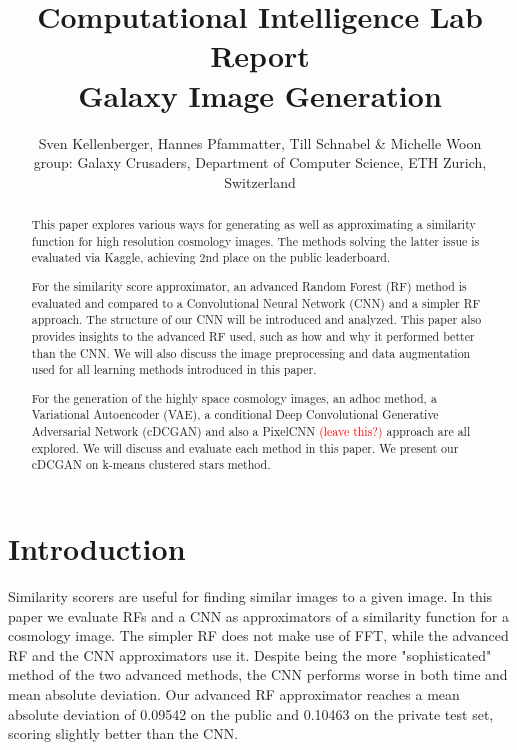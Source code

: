 \documentclass[10pt,conference,compsocconf]{IEEEtran}
\newcommand\TODO[1]{\textcolor{red}{#1}} %
\begin{document}
\title{Computational Intelligence Lab Report\\ {\large Galaxy Image Generation}}

\author{Sven Kellenberger, Hannes Pfammatter, Till Schnabel & Michelle Woon \\group: Galaxy Crusaders, Department of Computer Science, ETH Zurich, Switzerland}

\maketitle

\begin{abstract}
This paper explores various ways for generating as well as approximating a similarity function for high resolution cosmology images. The methods solving the latter issue is evaluated via Kaggle\cite{Kaggle}, achieving 2nd place on the public leaderboard.

For the similarity score approximator, an advanced Random Forest (RF) method is evaluated and compared to a Convolutional Neural Network (CNN) and a simpler RF approach. The structure of our CNN will be introduced and analyzed. This paper also provides insights to the advanced RF used, such as how and why it performed better than the CNN. We will also discuss the image preprocessing and data augmentation used for all learning methods introduced in this paper. 

For the generation of the highly space cosmology images, an adhoc method, a Variational Autoencoder (VAE), a conditional Deep Convolutional Generative Adversarial Network (cDCGAN) and also a PixelCNN \TODO{(leave this?)} approach are all explored. We will discuss and evaluate each method in this paper. We present our cDCGAN on k-means clustered stars method.
\end{abstract}

\section{Introduction}
\label{sec:introduction}
Similarity scorers are useful for finding similar images to a given image. In this paper we evaluate RFs and a CNN as approximators of a similarity function for a cosmology image. The simpler RF does not make use of FFT, while the advanced RF and the CNN approximators use it. Despite being the more "sophisticated" method of the two advanced methods, the CNN performs worse in both time and mean absolute deviation. Our advanced RF approximator reaches a mean absolute deviation of 0.09542 on the public and 0.10463 on the private test set, scoring slightly better than the CNN.
\end{document}
